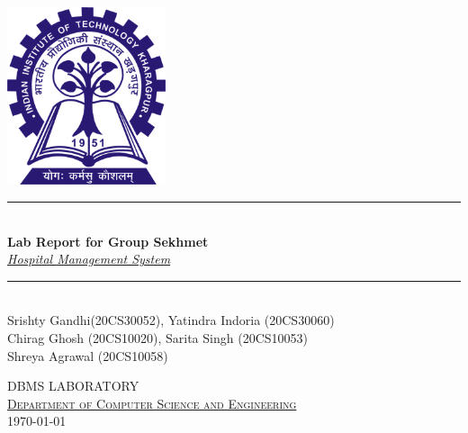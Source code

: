 \documentclass[12pt,a4paper]{article}
\newcommand{\HRule}{\rule{\linewidth}{0.5mm}}
\begin{document}
\begin{titlepage}
\begin{center}

\includegraphics[width=0.35\textwidth]{kgp_logo.png}~\\[2cm]


\HRule \\[0.4cm]
{ \LARGE 
  \textbf{Lab Report for Group Sekhmet}\\[0.4cm]
  \emph{\href{https://sekhmet.vercel.app/}{Hospital Management System}}\\[0.4cm]
}
\HRule \\[1.5cm]



{ \large
  Srishty Gandhi(20CS30052), Yatindra Indoria (20CS30060) \\
  Chirag Ghosh (20CS10020), Sarita Singh (20CS10053)\\
  Shreya Agrawal (20CS10058) 
}



\vfill

\textsc{\large DBMS LABORATORY\\ \href{https://cse.iitkgp.ac.in}{Department of Computer Science and Engineering} }\\[0.4cm]


{\large \today}
 
\end{center}
\end{titlepage}


\newpage



\end{document}

